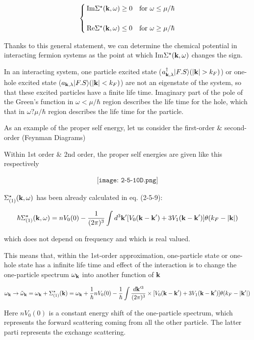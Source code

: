 \[\begin{cases}
\text{Im}\Sigma^\star({\bf k},\omega)\ge 0 &\text{for }\omega\le\mu/\hbar\\
& \\
\text{Re}\Sigma^\star({\bf k},\omega)\le 0 &\text{for }\omega\ge\mu/\hbar
\end{cases}\]

Thanks to this general statement, we can determine the chemical potential in interacting fermion systems as the point at which Im$\Sigma^\star({\bf k},\omega)$ changes the sign. 

In an interacting system, one particle excited state ($a^\dagger_{{\bf k},\lambda}|F.S\rangle (|{\bf k}|>k_F)$) or one-hole excited state ($a_{{\bf k},\lambda}|F.S\rangle (|{\bf k}|<k_F)$) are not an eigenstate of the system, so that these excited particles have a finite life time. Imaginary part of the pole of the Green's function in $\omega<\mu/\hbar$ region describes the life time for the hole, which that in $\omega?\mu/\hbar$ region describes the life time for the particle. 

As an example of the proper self energy, let us consider the first-order \& second-order (Feynman Diagrams)

Within 1st order \& 2nd order, the proper self energies are given like this respectively

\begin{align}
\texttt{[image: 2-5-10D.png]}
\end{align}

$\Sigma^\star_{(1)}({\bf k},\omega)$ has been already calculated in eq. (2-5-9):

\[\hbar\Sigma^\star_{(1)} ({\bf k},\omega) = nV_0(0)-\frac{1}{(2\pi)^3}\int d^3{\bf k}'[V_0({\bf k-k}')+3V_1({\bf k-k}')]\theta(k_F-|\bf k|) \]

which does not depend on frequency and which is real valued. 

This means that, within the 1st-order approximation, one-particle state or one-hole state has a infinite life time and effect of the interaction is to change the one-particle spectrum $\omega_{\bf k}$ into another function of $\bf k$

\[\omega_{\bf k}\to\tilde{\omega}_{\bf k} = \omega_{\bf k} + \Sigma^\star_{(1)}({\bf k})=\omega_{\bf k} + \frac{1}{\hbar}nV_0(0) - \frac{1}{\hbar}\int \frac{d{\bf k}'^3}{(2\pi)^3}\times[V_0({\bf k-k}')+3V_1({\bf k-k}')]\theta(k_F-|\bf k'|) \]

Here $nV_0(0)$ is a constant energy shift of the one-particle spectrum, which represents the forward scattering coming from all the other particle. The latter parti represents the exchange scattering. 

